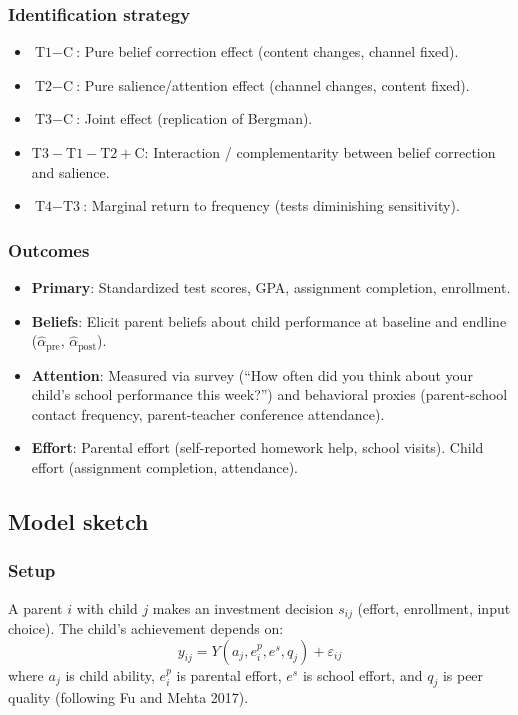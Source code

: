 \documentclass[11pt]{article}
\begin{document}
\subsubsection{Identification strategy}
\begin{itemize}
  \item $\text{T1} - \text{C}$: Pure belief correction effect (content changes, channel fixed).
  \item $\text{T2} - \text{C}$: Pure salience/attention effect (channel changes, content fixed).
  \item $\text{T3} - \text{C}$: Joint effect (replication of Bergman).
  \item $\text{T3} - \text{T1} - \text{T2} + \text{C}$: Interaction / complementarity between belief correction and salience.
  \item $\text{T4} - \text{T3}$: Marginal return to frequency (tests diminishing sensitivity).
\end{itemize}

\subsubsection{Outcomes}
\begin{itemize}
  \item \textbf{Primary}: Standardized test scores, GPA, assignment completion, enrollment.
  \item \textbf{Beliefs}: Elicit parent beliefs about child performance at baseline and endline ($\hat{\alpha}_{\text{pre}}$, $\hat{\alpha}_{\text{post}}$).
  \item \textbf{Attention}: Measured via survey (``How often did you think about your child's school performance this week?'') and behavioral proxies (parent-school contact frequency, parent-teacher conference attendance).
  \item \textbf{Effort}: Parental effort (self-reported homework help, school visits). Child effort (assignment completion, attendance).
\end{itemize}

\subsection{Model sketch}

\subsubsection{Setup}
A parent $i$ with child $j$ makes an investment decision $s_{ij}$ (effort, enrollment, input choice). The child's achievement depends on:
\[
y_{ij} = Y(a_j, e^p_i, e^s, q_j) + \varepsilon_{ij}
\]
where $a_j$ is child ability, $e^p_i$ is parental effort, $e^s$ is school effort, and $q_j$ is peer quality (following Fu and Mehta 2017).
\end{document}
